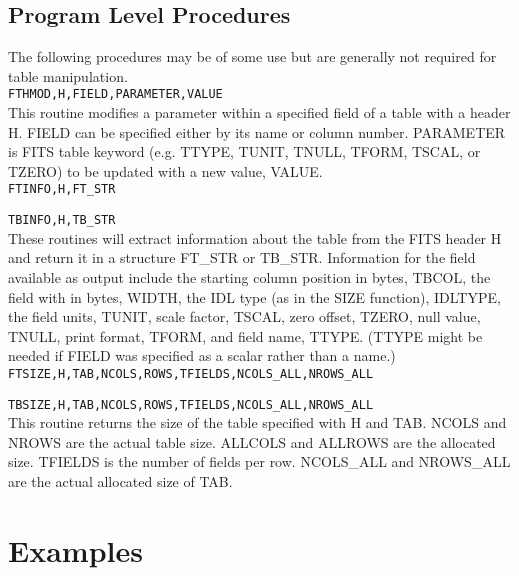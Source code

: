 \subsection{Program Level Procedures}

    The following procedures may be of some use but are generally
    not required for table manipulation. \\
 
{\tt FTHMOD,H,FIELD,PARAMETER,VALUE} \\

        This routine modifies a parameter within a specified field
        of a table with a header H.  FIELD can be specified either
        by its name or column number.  PARAMETER is FITS table keyword
        (e.g. TTYPE, TUNIT, TNULL, TFORM, TSCAL, or TZERO) to be
        updated with a new value, VALUE.  \\

{\tt FTINFO,H,FT\_STR}

{\tt TBINFO,H,TB\_STR} \\
   
	These routines will extract information about the table from the FITS
        header H and return it in a structure FT\_STR or TB\_STR.    Information 
        for the field available as 
        output include the starting column position in bytes, TBCOL, 
        the field with in bytes, WIDTH, the IDL type (as in the SIZE 
        function), IDLTYPE, the field units, TUNIT, scale factor, 
        TSCAL, zero offset, TZERO, null value, TNULL, print format,
        TFORM, and field name, TTYPE.  (TTYPE might be needed if FIELD 
        was specified as a scalar rather than a name.)  \\
 
{\tt FTSIZE,H,TAB,NCOLS,ROWS,TFIELDS,NCOLS\_ALL,NROWS\_ALL} 

{\tt TBSIZE,H,TAB,NCOLS,ROWS,TFIELDS,NCOLS\_ALL,NROWS\_ALL} \\
 
	This routine returns the size of the table specified with H
        and TAB.  NCOLS and NROWS are the actual table size.  ALLCOLS
	and ALLROWS are the allocated size.  TFIELDS is the number of
        fields per row.  NCOLS\_ALL and NROWS\_ALL are the actual
        allocated size of TAB.
 
\section{Examples}
 
